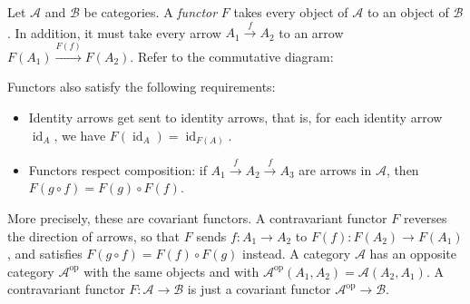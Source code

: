 \begin{definition}[Functors]
    Let $\mathcal{A}$ and $\mathcal{B}$ be categories. A \emph{functor} $F$ takes every object of $\mathcal{A}$ to an object of $\mathcal{B}$. In addition, it must take every arrow $A_1 \overset{f}{\to }A_2$ to an arrow $F(A_1)\overset{F(f)}{\longrightarrow }F(A_2).$ Refer to the commutative diagram:
            \begin{figure}[H]
                \centering
            \end{figure}
        Functors also satisfy the following requirements:
        \begin{itemize}
            \item Identity arrows get sent to identity arrows, that is, for each identity arrow $\operatorname{id}_A$, we have $F(\operatorname{id}_A)=\operatorname{id}_{F(A)}$.
            \item Functors respect composition: if $A_1\overset{f}{\to }A_2\overset{f}{\to }A_3$ are arrows in $\mathcal{A}$, then $F(g\circ f)=F(g)\circ F(f)$.
        \end{itemize}
\end{definition}
More precisely, these are covariant functors. A contravariant functor $F$ reverses the direction of arrows, so that $F$ sends $f \colon A_1 \to A_2$ to $F(f) \colon F(A_2) \to F(A_1)$, and satisfies $F(g\circ f)=F(f)\circ F(g)$ instead. A category $\mathcal{A}$ has an opposite category $\mathcal{A}^{\text{op}}$ with the same objects and with $\mathcal{A}^{\text{op}}(A_1,A_2)=\mathcal{A}(A_2,A_1)$. A contravariant functor $F \colon \mathcal{A} \to \mathcal{B}$ is just a covariant functor $\mathcal{A}^{\text{op}}\to \mathcal{B}$. 

